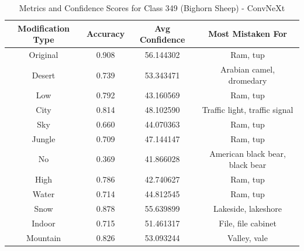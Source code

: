 \begin{table}
	\centering
	\begin{tabular}{|c|c|c|c|}
		\hline
		\textbf{Modification Type} & \textbf{Accuracy} & \textbf{Avg Confidence} & \textbf{Most Mistaken For} \\
		\hline
		Original & 0.908 & 56.144302 & Ram, tup \\
		\hline
		Desert & 0.739 & 53.343471 & Arabian camel, dromedary \\
		\hline
		Low & 0.792 & 43.160569 & Ram, tup \\
		\hline
		City & 0.814 & 48.102590 & Traffic light, traffic signal \\
		\hline
		Sky & 0.660 & 44.070363 & Ram, tup \\
		\hline
		Jungle & 0.709 & 47.144147 & Ram, tup \\
		\hline
		No & 0.369 & 41.866028 & American black bear, black bear \\
		\hline
		High & 0.786 & 42.740627 & Ram, tup \\
		\hline
		Water & 0.714 & 44.812545 & Ram, tup \\
		\hline
		Snow & 0.878 & 55.639899 & Lakeside, lakeshore \\
		\hline
		Indoor & 0.715 & 51.461317 & File, file cabinet \\
		\hline
		Mountain & 0.826 & 53.093244 & Valley, vale \\
		\hline
	\end{tabular}
	\caption{Metrics and Confidence Scores for Class 349 (Bighorn Sheep) - ConvNeXt}
	\label{tab:metrics_confidence_class_349_convnext}
\end{table}

